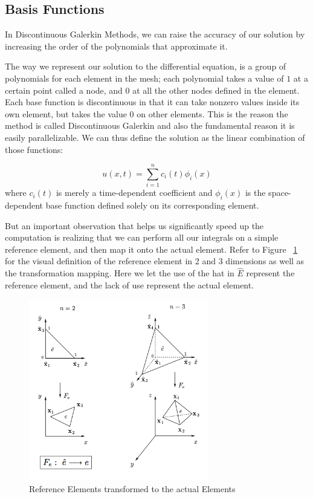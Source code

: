 \subsection{Basis Functions}

In Discontinuous Galerkin Methods, we can raise the accuracy of our solution by increasing the order of the polynomials that approximate it. 

The way we represent our solution to the differential equation, is a group of polynomials for each element in the mesh; each polynomial takes a value of $1$ at a certain point called a node, and $0$ at all the other nodes defined in the element. Each base function is discontinuous in that it can take nonzero values inside its own element, but takes the value $0$ on other elements. This is the reason the method is called Discontinuous Galerkin and also the fundamental reason it is easily parallelizable. We can thus define the solution as the linear combination of those functions:

$$u(x,t) = \sum\limits_{i=1}^n c_i(t)\phi_i(x)$$ 
where $c_i(t)$ is merely a time-dependent coefficient and $\phi_i(x)$ is the space-dependent base function defined solely on its corresponding element.


But an important observation that helps us significantly speed up the computation is realizing that we can perform all our integrals on a simple reference element, and then map it onto the actual element. Refer to Figure ~\ref{fig:Reference-Elements} for the visual definition of the reference element in 2 and 3 dimensions as well as the transformation mapping. Here we let the use of the hat in $\hat{E}$ represent the reference element, and the lack of use represent the actual element.


\begin{figure}[ht]
	\centering
	\includegraphics[width=0.7\textwidth]{Images/Reference-Elements.png}
	\caption{Reference Elements transformed to the actual Elements}
	\label{fig:Reference-Elements}
\end{figure}

